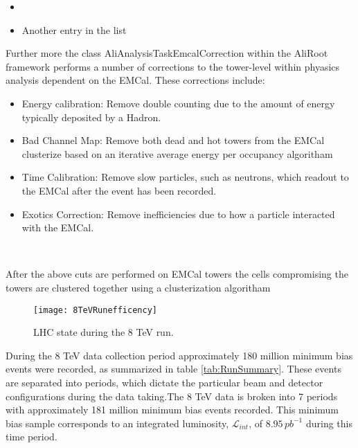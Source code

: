 \begin{itemize}
  \item 
  \item Another entry in the list
\end{itemize}

Further more the class AliAnalysisTaskEmcalCorrection within the AliRoot framework performs a number of corrections to the tower-level within phyasics analysis dependent on the EMCal.  These corrections include:

\begin{itemize}
  \item Energy calibration:  Remove double counting due to the amount of energy typically deposited by a Hadron.
  \item Bad Channel Map: Remove both dead and hot towers from the EMCal clusterize based on an iterative average energy per occupancy algoritham
  \item Time Calibration:  Remove slow particles, such as neutrons, which readout to the EMCal after the event has been recorded.
   \item Exotics Correction:  Remove inefficiencies due to how a particle interacted with the EMCal.
\end{itemize}\

After the above cuts are performed on EMCal towers the cells compromising the towers are clustered together using a clusterization algoritham 



\begin{figure}[h]
\texttt{[image: 8TeVRunefficency]}
\centering
\caption{LHC state during the 8 TeV run. }
\label{fig:RunEff}
\end{figure}

During the 8 TeV data collection period approximately 180 million minimum bias events were recorded, as summarized in table \ref{tab:RunSummary}.  These events are separated into periods, which dictate the particular beam and detector configurations during the data taking.The 8 TeV data is broken into 7 periods with approximately 181 million minimum bias events recorded.  This minimum bias sample corresponds to an integrated luminosity, $\mathscr{L}_{int}$, of $8.95 \, pb^{-1}$ during this time period\cite{ALICE-PUBLIC-2017-002}.

